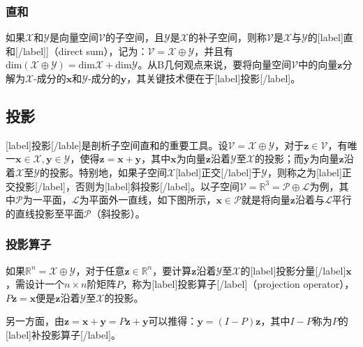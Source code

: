 \documentclass[UTF8,nofonts]{ctexart}
\begin{document}
\subsubsection*{直和}

如果$\mathcal{X}$和$\mathcal{Y}$是向量空间$\mathcal{V}$的子空间，且$\mathcal{Y}$是$\mathcal{X}$的补子空间，则称$\mathcal{V}$是$\mathcal{X}$与$\mathcal{Y}$的[label]直和[/label]]（direct sum），记为：$\mathcal{V}=\mathcal{X}\oplus\mathcal{Y}$，并且有$\text{dim}(\mathcal{X}\oplus\mathcal{Y})=\text{dim}\mathcal{X}+\text{dim}\mathcal{Y}$。从B几何观点来说，要将向量空间$\mathcal{V}$中的向量$\boldsymbol{z}$分解为$\mathcal{X}$-成分的$\boldsymbol{x}$和$\mathcal{Y}$-成分的$\boldsymbol{y}$，其关键技术便在于[label]投影[/label]。

\subsection*{投影}

[label]投影[/lable]是剖析子空间直和的重要工具。设$\mathcal{V}=\mathcal{X}\oplus\mathcal{Y}$，对于$\boldsymbol{z}\in\mathcal{V}$，有唯一$\boldsymbol{x}\in\mathcal{X},\boldsymbol{y}\in\mathcal{Y}$，使得$\boldsymbol{z}=\boldsymbol{x}+\boldsymbol{y}$，其中$\boldsymbol{x}$为向量$\boldsymbol{z}$沿着$\mathcal{Y}$至$\mathcal{X}$的投影；而$\boldsymbol{y}$为向量$\boldsymbol{z}$沿着$\mathcal{X}$至$\mathcal{Y}$的投影。特别地，如果子空间$\mathcal{X}$[label]正交[/label]于$\mathcal{Y}$，则称之为[label]正交投影[/label]，否则为[label]斜投影[/label]。以子空间$\mathcal{V}=\mathbb{R}^3=\mathcal{P}\oplus\mathcal{L}$为例，其中$\mathcal{P}$为一平面，$\mathcal{L}$为平面外一直线，如下图所示，$\boldsymbol{x}\in\mathcal{P}$就是将向量$\boldsymbol{z}$沿着与$\mathcal{L}$平行的直线投影至平面$\mathcal{P}$（斜投影）。

\subsubsection*{投影算子}

如果$\mathbb{R}^n=\mathcal{X}\oplus\mathcal{Y}$，对于任意$\boldsymbol{z}\in\mathbb{R}^n$，要计算$\boldsymbol{z}$沿着$\mathcal{Y}$至$\mathcal{X}$的[label]投影分量[/label]$\boldsymbol{x}$，需设计一个$n \times n$阶矩阵$P$，称为[label]投影算子[/label]（projection operator），$P\boldsymbol{z}=\boldsymbol{x}$便是$\boldsymbol{z}$沿着$\mathcal{Y}$至$\mathcal{X}$的投影。

另一方面，由$\boldsymbol{z}=\boldsymbol{x}+\boldsymbol{y}=P\boldsymbol{z}+\boldsymbol{y}$可以推得：$\boldsymbol{y}=(I-P)\boldsymbol{z}$，其中$I-P$称为$P$的[label]补投影算子[/label]。
\end{document}

